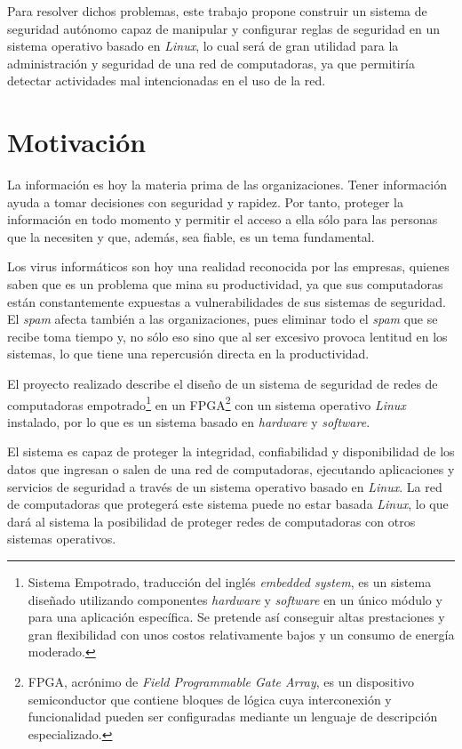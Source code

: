 Para resolver dichos problemas, este trabajo propone construir un sistema de
seguridad autónomo capaz de manipular y configurar reglas de seguridad en un
sistema operativo basado en \emph{Linux}, lo cual será de gran utilidad para la
administración y seguridad de una red de computadoras, ya que permitiría 
 detectar actividades mal intencionadas en el uso de la red.


\section{Motivación}

La información es hoy la materia prima de las organizaciones. Tener información
ayuda a tomar decisiones con seguridad y rapidez. Por tanto, proteger la
información en todo momento y permitir el acceso a ella sólo para las personas
que la necesiten y que, además, sea fiable, es un tema fundamental.

Los virus inform\'aticos son hoy una realidad reconocida por las empresas,
quienes saben que es un problema que mina su productividad, ya que sus
computadoras est\'an constantemente expuestas a vulnerabilidades de sus sistemas
de seguridad. El \emph{spam} afecta tambi\'en a las organizaciones, pues
eliminar todo el \emph{spam} que se recibe toma tiempo y, no s\'olo eso sino que
al ser excesivo provoca lentitud en los sistemas, lo que tiene una repercusi\'on
directa en la productividad.

El proyecto realizado describe el diseño de un sistema de seguridad de redes de
computadoras empotrado\footnote{Sistema Empotrado, traducci\'on del
ingl\'es \emph{embedded system}, es un sistema dise\~nado utilizando
componentes \emph{hardware} y \emph{software} en un \'unico m\'odulo y para una
aplicaci\'on espec\'ifica. Se pretende as\'i conseguir altas prestaciones y gran
flexibilidad con unos costos relativamente bajos y un consumo de
energ\'ia moderado.} en un FPGA\footnote{FPGA, acrónimo de \emph{Field
Programmable Gate Array}, es un dispositivo semiconductor que contiene bloques
de lógica cuya interconexión y funcionalidad pueden ser configuradas mediante un
lenguaje de descripción especializado.} con un sistema operativo \emph{Linux}
instalado, por lo que es  un sistema basado en \emph{hardware} y
\emph{software}.

El sistema es capaz de proteger la integridad, confiabilidad
y disponibilidad de los datos que ingresan o salen de una red de computadoras, 
ejecutando aplicaciones y servicios de seguridad a través de un sistema
operativo basado en \emph{Linux}. La red de computadoras que proteger\'a este
sistema puede no estar basada \emph{Linux}, lo que dar\'a al sistema la
posibilidad de proteger redes de computadoras con otros sistemas
operativos.


